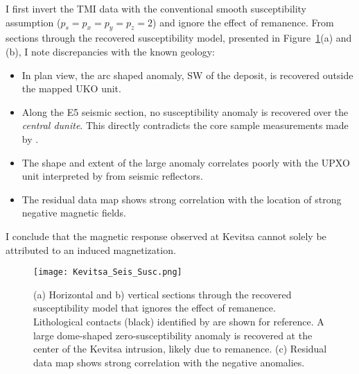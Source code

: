 I first invert the TMI data with the conventional smooth susceptibility assumption ($p_s=p_x=p_y=p_z=2$) and ignore the effect of remanence.
From sections through the recovered susceptibility model, presented in Figure~\ref{MAG_lp_EW}(a) and (b), I note discrepancies with the known geology:
\begin{itemize}
\item In plan view, the arc shaped anomaly, SW of the deposit, is recovered outside the mapped UKO unit.
\item Along the E5 seismic section, no susceptibility anomaly is recovered over the \emph{central dunite}. This directly contradicts the core sample measurements made by \cite{Montonen2012}.
\item The shape and extent of the large anomaly correlates poorly with the UPXO unit interpreted by \cite{Koivisto2015} from seismic reflectors.
\item The residual data map shows strong correlation with the location of strong negative magnetic fields.
\end{itemize}
I conclude that the magnetic response observed at Kevitsa cannot solely be attributed to an induced magnetization.
\begin{figure}[h!]
\texttt{[image: Kevitsa\_Seis\_Susc.png]}
\caption{(a) Horizontal and b) vertical sections through the recovered susceptibility model that ignores the effect of remanence. Lithological contacts (black) identified by \cite{Koivisto2015} are shown for reference. A large dome-shaped zero-susceptibility anomaly is recovered at the center of the Kevitsa intrusion, likely due to remanence. (c) Residual data map shows strong correlation with the negative anomalies.}
\label{MAG_lp_EW}
\end{figure}

